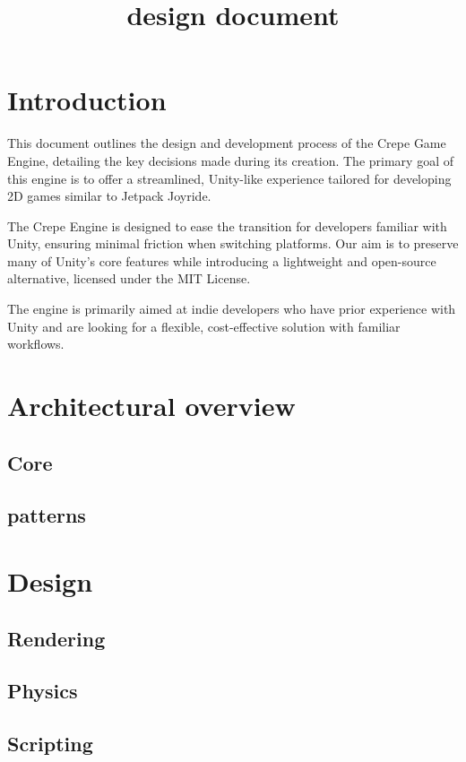 \documentclass{projdoc}
\title{design document}
\begin{document}
\tablestables
\newpage

\section{Introduction} This document outlines the design and development process of the Crepe Game Engine, detailing the key decisions made during its creation. The primary goal of this engine is to offer a streamlined, Unity-like experience tailored for developing 2D games similar to Jetpack Joyride.

The Crepe Engine is designed to ease the transition for developers familiar with Unity, ensuring minimal friction when switching platforms. Our aim is to preserve many of Unity’s core features while introducing a lightweight and open-source alternative, licensed under the MIT License.

The engine is primarily aimed at indie developers who have prior experience with Unity and are looking for a flexible, cost-effective solution with familiar workflows.


\section{Architectural overview}

\subsection{Core}

\subsection{patterns}

\section{Design}

\subsection{Rendering}

\subsection{Physics}

\subsection{Scripting}
\end{document}

